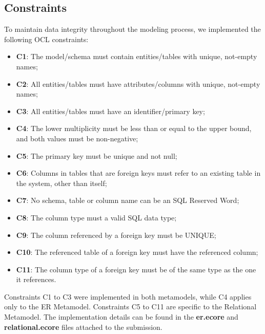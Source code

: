 \documentclass[10pt]{article}
\begin{document}
\subsection{Constraints}

To maintain data integrity throughout the modeling process, we implemented the following OCL constraints:

\begin{itemize}

    \item \textbf{C1}: The model/schema must contain entities/tables with unique, not-empty names;

    \item \textbf{C2}: All entities/tables must have attributes/columns with unique, not-empty names;
    
    \item \textbf{C3}: All entities/tables must have an identifier/primary key;
    
    \item \textbf{C4}: The lower multiplicity must be less than or equal to the upper bound, and both values must be non-negative;
    
    \item \textbf{C5}: The primary key must be unique and not null;
    
    \item \textbf{C6}: Columns in tables that are foreign keys must refer to an existing table in the system, other than itself;

    \item \textbf{C7}: No schema, table or column name can be an SQL Reserved Word;

    \item \textbf{C8}: The column type must a valid SQL data type;

    \item \textbf{C9}: The column referenced by a foreign key must be UNIQUE;

    \item \textbf{C10}: The referenced table of a foreign key must have the referenced column;

    \item \textbf{C11}: The column type of a foreign key must be of the same type as the one it references.

    
    
\end{itemize}

Constraints C1 to C3 were implemented in both metamodels, while C4 applies only to the ER Metamodel. Constraints C5 to C11 are specific to the Relational Metamodel. The implementation details can be found in the \textbf{er.ecore} and \textbf{relational.ecore} files attached to the submission.
\end{document}
